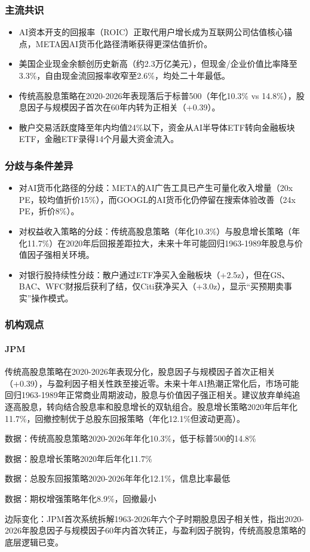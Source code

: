 \documentclass[11pt]{ctexart}
\begin{document}
\subsubsection*{主流共识}
\begin{itemize}
  \item AI资本开支的回报率（ROIC）正取代用户增长成为互联网公司估值核心锚点，META因AI货币化路径清晰获得更深估值折价。
  \item 美国企业现金余额创历史新高（约2.3万亿美元），但现金/企业价值比率降至3.3\%，自由现金流回报率收窄至2.6\%，均处二十年最低。
  \item 传统高股息策略在2020-2026年表现落后于标普500（年化10.3\% vs 14.8\%），股息因子与规模因子首次在60年内转为正相关（+0.39）。
  \item 散户交易活跃度降至年内均值24\%以下，资金从AI半导体ETF转向金融板块ETF，金融ETF录得14个月最大资金流入。
\end{itemize}
\subsubsection*{分歧与条件差异}
\begin{itemize}
  \item 对AI货币化路径的分歧：META的AI广告工具已产生可量化收入增量（20x PE，较均值折价15\%），而GOOGL的AI货币化仍停留在搜索体验改善（24x PE，折价8\%）。
  \item 对权益收入策略的分歧：传统高股息策略（年化10.3\%）与股息增长策略（年化11.7\%）在2020年后回报差距拉大，未来十年可能回归1963-1989年股息与价值因子强相关环境。
  \item 对银行股持续性分歧：散户通过ETF净买入金融板块（+2.5z），但在GS、BAC、WFC财报后获利了结，仅Citi获净买入（+3.0z），显示“买预期卖事实”操作模式。
\end{itemize}
\subsubsection*{机构观点}
\paragraph{JPM} 传统高股息策略在2020-2026年表现分化，股息因子与规模因子首次正相关（+0.39），与盈利因子相关性跌至接近零。未来十年AI热潮正常化后，市场可能回归1963-1989年正常商业周期波动，股息与价值因子强正相关。建议放弃单纯追逐高股息，转向结合股息率和股息增长的双轨组合。股息增长策略2020年后年化11.7\%，回撤控制优于总股东回报策略（年化12.1\%但波动更高）。
{\small\color{refgray}数据：传统高股息策略2020-2026年年化10.3\%，低于标普500的14.8\%\par}
{\small\color{refgray}数据：股息增长策略2020年后年化11.7\%\par}
{\small\color{refgray}数据：总股东回报策略2020-2026年年化12.1\%，信息比率最低\par}
{\small\color{refgray}数据：期权增强策略年化8.9\%，回撤最小\par}
{\small\color{refgray}边际变化：JPM首次系统拆解1963-2026年六个子时期股息因子相关性，指出2020-2026年股息因子与规模因子60年内首次转正，与盈利因子脱钩，传统高股息策略的底层逻辑已变。\par}
\end{document}
